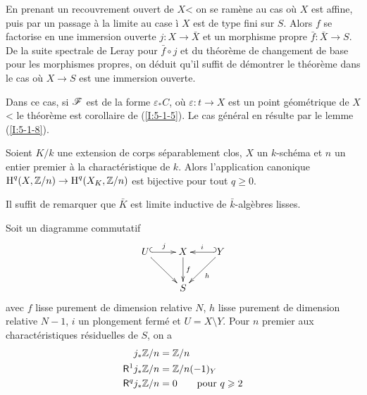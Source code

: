 \documentclass[oneside]{book}
\begin{document}
En prenant un recouvrement ouvert de $X$< on se ramène au cas où $X$ est 
affine, puis par un passage à la limite au case \`i $X$ est de type fini sur 
$S$. Alors $f$ se factorise en une immersion ouverte $j:X\to \bar X$ et un 
morphisme propre $\bar f:\bar X\to S$. De la suite spectrale de Leray pour 
$\bar f\circ j$ et du théorème de changement de base pour les morphismes 
propres, on déduit qu'il suffit de démontrer le théorème dans le cas 
où $X\to S$ est une immersion ouverte. 

Dans ce cas, si $\mathscr{F}$ est de la forme $\varepsilon_* C$, où 
$\varepsilon:t\to X$ est un point géométrique de $X$< le théorème est 
corollaire de (\ref{I:5-1-5}). Le cas général en résulte par le lemme 
(\ref{I:5-1-8}). 





\begin{corollary}\label{I:5-3-3}
Soient $K/k$ une extension de corps séparablement clos, $X$ un $k$-schéma 
et $n$ un entier premier à la charactéristique de $k$. Alors l'application 
canonique $\operatorname{H}^q(X,\mathbb{Z}/n) \to \operatorname{H}^q(X_K,\mathbb{Z}/n)$ est bijective pour tout 
$q\geqslant 0$. 
\end{corollary}

Il suffit de remarquer que $\bar K$ est limite inductive de $\bar k$-algèbres 
lisses. 





\begin{theorem}\label{I:5-3-4}
Soit un diagramme commutatif 
\begin{equation}\label{I:eq:7}\xymatrix{
  U \ar@{^{(}->}[r]^-j \ar[dr]
    & X \ar[d]^-f 
    & \ar@{_{(}->}[l]_-i Y \ar[dl]^-h \\
  & S
}\end{equation}
avec $f$ lisse purement de dimension relative $N$, $h$ lisse purement de 
dimension relative $N-1$, $i$ un plongement fermé et $U=X\setminus Y$. Pour 
$n$ premier aux charactéristiques résiduelles de $S$, on a 
\begin{equation*}
\begin{aligned}
  j_* \mathbb{Z}/n     &= \mathbb{Z}/n \\
  \mathsf{R}^1 j_*\mathbb{Z}/n &= \mathbb{Z}/n(-1)_Y \\
  \mathsf{R}^q j_*\mathbb{Z}/n &= 0 \qquad \text{pour $q\geqslant 2$}
\end{aligned}
\end{equation*}
\end{theorem}
\end{document}
